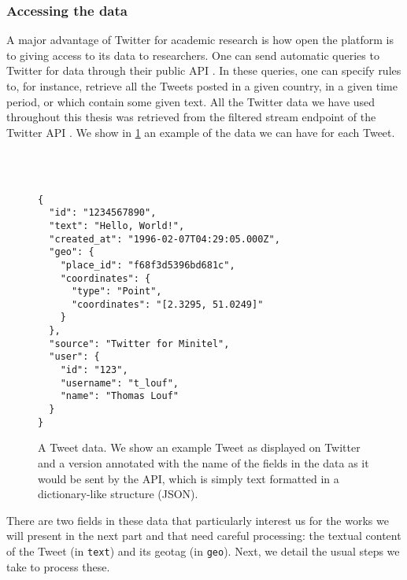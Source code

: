 \documentclass[../thesis.tex]{subfiles}
\begin{document}
\subsubsection{Accessing the data}
A major advantage of Twitter for academic research is how open the platform is to giving
access to its data to researchers. One can send automatic queries to Twitter for data
through their public \ac{API} \cite{TwitterAPI}. In these queries, one can specify rules
to, for instance, retrieve all the Tweets posted in a given country, in a given time
period, or which contain some given text. All the Twitter data we have used throughout
this thesis was retrieved from the filtered stream endpoint of the Twitter \ac{API}
\cite{TwitterAPIa}. We show in \cref{fig:tweet_data} an example of the data we can have
for each Tweet.

\captionsetup[subfigure]{position=top,textfont=normalfont,singlelinecheck=off,justification=raggedright}
\begin{figure}
  \centering
  \\
  \\
  \begin{SubFloat}{\label{subfig:json}}
    \begin{minipage}[b]{0.95\linewidth}
        \begin{lstlisting}[frame=single,xleftmargin=5mm]
{
  "id": "1234567890",
  "text": "Hello, World!",
  "created_at": "1996-02-07T04:29:05.000Z",
  "geo": {
    "place_id": "f68f3d5396bd681c",
    "coordinates": {
      "type": "Point",
      "coordinates": "[2.3295, 51.0249]"
    }
  },
  "source": "Twitter for Minitel",
  "user": {
    "id": "123",
    "username": "t_louf",
    "name": "Thomas Louf"
  }
}
      \end{lstlisting}
    \end{minipage}
  \end{SubFloat}
  \caption[]{A Tweet data. We show  an example Tweet as displayed
  on Twitter and  a version annotated with the name of the
  fields in  the data as it would be sent by the \ac{API}, which is
  simply text formatted in a dictionary-like structure (JSON).}
  \label{fig:tweet_data}
\end{figure}

There are two fields in these data that particularly interest us for the works we will
present in the next part and that need careful processing: the textual content of the
Tweet (in \texttt{text}) and its geotag (in \texttt{geo}). Next, we detail the usual
steps we take to process these. 
\end{document}
